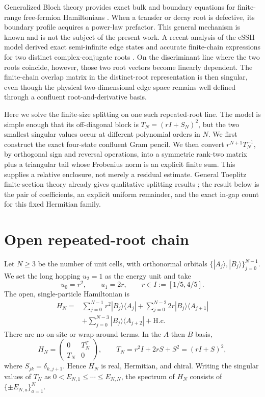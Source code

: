 \documentclass[aps,prb,reprint,superscriptaddress,longbibliography]{revtex4-2}
\begin{document}
Generalized Bloch theory provides exact bulk and boundary equations for
finite-range free-fermion Hamiltonians \cite{Alase2016,Alase2017}.  When a
transfer or decay root is defective, its boundary profile acquires a
power-law prefactor.  This general mechanism is known and is not the subject
of the present work.  A recent analysis of the eSSH model derived exact
semi-infinite edge states and accurate finite-chain expressions for two
distinct complex-conjugate roots \cite{Grizzi2026}.  On the discriminant line
where the two roots coincide, however, those two root vectors become
linearly dependent.  The finite-chain overlap matrix in the distinct-root
representation is then singular, even though the physical two-dimensional
edge space remains well defined through a confluent root-and-derivative
basis.

Here we solve the finite-size splitting on one such repeated-root line.  The
model is simple enough that its off-diagonal block is
$T_N=(rI+S_N)^2$, but the two smallest singular values occur at different
polynomial orders in $N$.  We first construct the exact four-state confluent
Gram pencil.  We then convert $r^{N+1}T_N^{-1}$, by orthogonal sign and reversal
operations, into a symmetric rank-two matrix plus a triangular tail whose
Frobenius norm is an explicit finite sum.  This supplies a relative enclosure,
not merely a residual estimate.  General Toeplitz finite-section theory
already gives qualitative splitting results \cite{Rogozhin2006}; the result
below is the pair of coefficients, an explicit uniform remainder, and the
exact in-gap count for this fixed Hermitian family.

\section{Open repeated-root chain}
\label{sec:model}

Let $N\geq3$ be the number of unit cells, with orthonormal orbitals
$\{|A_j\rangle,|B_j\rangle\}_{j=0}^{N-1}$.  We set the long hopping $u_2=1$
as the energy unit and take
\begin{equation}
 u_0=r^2,\qquad u_1=2r,\qquad r\in I:=[1/5,4/5].
\end{equation}
The open, single-particle Hamiltonian is
\begin{align}
 H_N={}&\sum_{j=0}^{N-1}r^2|B_j\rangle\langle A_j|
 +\sum_{j=0}^{N-2}2r|B_j\rangle\langle A_{j+1}| \nonumber\\
 &+\sum_{j=0}^{N-3}|B_j\rangle\langle A_{j+2}|+\mathrm{H.c.}
 \label{eq:H}
\end{align}
There are no on-site or wrap-around terms.  In the $A$-then-$B$ basis,
\begin{equation}
 H_N=\begin{pmatrix}0&T_N^T\\T_N&0\end{pmatrix},\qquad
 T_N=r^2I+2rS+S^2=(rI+S)^2,
 \label{eq:block}
\end{equation}
where $S_{jk}=\delta_{k,j+1}$.  Hence $H_N$ is real, Hermitian, and chiral.
Writing the singular values of $T_N$ as
$0<E_{N,1}\leq\cdots\leq E_{N,N}$, the spectrum of $H_N$ consists of
$\{\pm E_{N,a}\}_{a=1}^N$.
\end{document}
